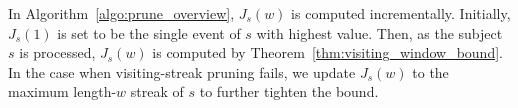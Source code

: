 In Algorithm~\ref{algo:prune_overview}, $J_s(w)$ is computed incrementally. Initially, $J_s(1)$
is set to be the single event of $s$ with highest value. Then, as the subject $s$ is processed,
$J_s(w)$ is computed by Theorem~\ref{thm:visiting_window_bound}. In the case when
visiting-streak pruning fails, we update $J_s(w)$ to the maximum length-$w$ streak of $s$ to further tighten
the bound. 



